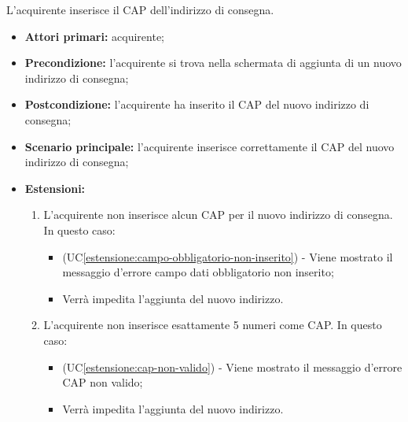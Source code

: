 L'acquirente inserisce il CAP dell'indirizzo di consegna.
\begin{itemize}
    \item \textbf{Attori primari:} acquirente;
    \item \textbf{Precondizione:} l'acquirente si trova nella schermata di aggiunta di un nuovo indirizzo di consegna;
    \item \textbf{Postcondizione:} l'acquirente ha inserito il CAP del nuovo indirizzo di consegna;
    \item \textbf{Scenario principale:} l'acquirente inserisce correttamente il CAP del nuovo indirizzo di consegna;
    \item \textbf{Estensioni:}
    \begin{enumerate}[label=\lett]
        \item L'acquirente non inserisce alcun CAP per il nuovo indirizzo di consegna. In questo caso:
        \begin{itemize}
            \item (UC\ref{estensione:campo-obbligatorio-non-inserito}) - Viene mostrato il messaggio d'errore campo dati obbligatorio non inserito;
            \item Verrà impedita l'aggiunta del nuovo indirizzo.
        \end{itemize}
        \item L'acquirente non inserisce esattamente 5 numeri come CAP. In questo caso:
        \begin{itemize}
            \item (UC\ref{estensione:cap-non-valido}) - Viene mostrato il messaggio d'errore CAP non valido;
            \item Verrà impedita l'aggiunta del nuovo indirizzo.
        \end{itemize}
    \end{enumerate}
\end{itemize}


\label{modifica-indirizzo-consegna}

